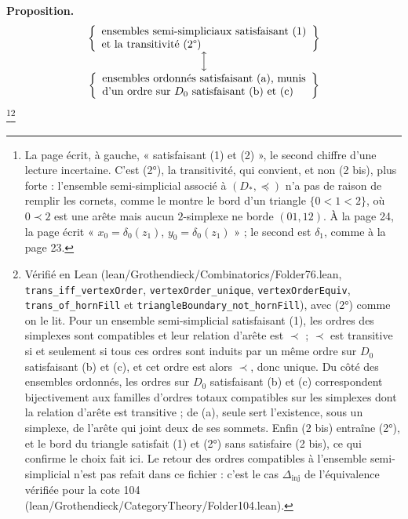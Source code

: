 \documentclass[11pt,a4paper]{article}
\begin{document}
\textbf{Proposition.}
\[
  \begin{array}{c}
  \left\{
  \begin{array}{l}
    \text{ensembles semi-simpliciaux satisfaisant (1)}\\
    \text{et la transitivité (2°)}
  \end{array}
  \right\}
  \\[1ex] \Big\updownarrow \\[1ex]
  \left\{
  \begin{array}{l}
    \text{ensembles ordonnés satisfaisant (a), munis}\\
    \text{d'un ordre sur } D_0 \text{ satisfaisant (b) et (c)}
  \end{array}
  \right\}
  \end{array}
\]
\footnote{La page écrit, à gauche, « satisfaisant (1) et (2) », le second
chiffre d'une lecture incertaine. C'est (2°), la transitivité, qui convient,
et non (2 bis), plus forte : l'ensemble semi-simplicial associé à $(D_*,
\preccurlyeq)$ n'a pas de raison de remplir les cornets, comme le montre le
bord d'un triangle $\{0 < 1 < 2\}$, où $0 \prec 2$ est une arête mais aucun
$2$-simplexe ne borde $(01, 12)$. À la page 24, la page écrit « $x_0 =
\delta_0(z_1)$, $y_0 = \delta_0(z_1)$ » ; le second est $\delta_1$, comme à la
page 23.}\footnote{Vérifié en Lean (lean/Grothendieck/Combinatorics/Folder76.lean,
\texttt{trans\_iff\_vertexOrder}, \texttt{vertexOrder\_unique},
\texttt{vertexOrderEquiv}, \texttt{trans\_of\_hornFill} et
\texttt{triangleBoundary\_not\_hornFill}), avec (2°) comme on le lit. Pour un
ensemble semi-simplicial satisfaisant (1), les ordres des simplexes sont
compatibles et leur relation d'arête est $\prec$ ; $\prec$ est transitive si et
seulement si tous ces ordres sont induits par un même ordre sur $D_0$
satisfaisant (b) et (c), et cet ordre est alors $\prec$, donc unique. Du côté
des ensembles ordonnés, les ordres sur $D_0$ satisfaisant (b) et (c)
correspondent bijectivement aux familles d'ordres totaux compatibles sur les
simplexes dont la relation d'arête est transitive ; de (a), seule sert
l'existence, sous un simplexe, de l'arête qui joint deux de ses sommets. Enfin
(2 bis) entraîne (2°), et le bord du triangle satisfait (1) et (2°) sans
satisfaire (2 bis), ce qui confirme le choix fait ici. Le retour des ordres
compatibles à l'ensemble semi-simplicial n'est pas refait dans ce fichier :
c'est le cas $\Delta_{\mathrm{inj}}$ de l'équivalence vérifiée pour la cote 104
(lean/Grothendieck/CategoryTheory/Folder104.lean).}
\end{document}
